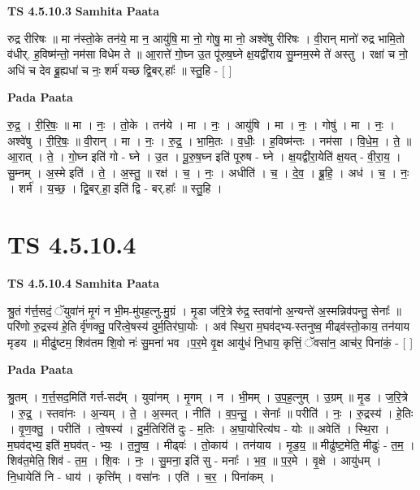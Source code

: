 \documentclass[17pt]{extarticle}
\begin{document}
\textbf{TS 4.5.10.3 } \newline
\textbf{Samhita Paata} \newline

रुद्र रीरिषः ॥ मा न॑स्तो॒के तन॑ये॒ मा न॒ आयु॑षि॒ मा नो॒ गोषु॒ मा नो॒ अश्वे॑षु रीरिषः । वी॒रान् मानो॑ रुद्र भामि॒तो व॑धीर्. ह॒विष्म॑न्तो॒ नम॑सा विधेम ते ॥ आ॒रात्ते॑ गो॒घ्न उ॒त पू॑रुष॒घ्ने क्ष॒यद्वी॑राय सु॒म्नम॒स्मे ते॑ अस्तु । रक्षा॑ च नो॒ अधि॑ च देव ब्रू॒ह्यधा॑ च नः॒ शर्म॑ यच्छ द्वि॒बर्.हाः᳚ ॥ स्तु॒हि - [  ] \newline

\textbf{Pada Paata} \newline

रु॒द्र॒ । री॒रि॒षः॒ ॥ मा । नः॒ । तो॒के । तन॑ये । मा । नः॒ । आयु॑षि । मा । नः॒ । गोषु॑ । मा । नः॒ । अश्वे॑षु । री॒रि॒षः॒ ॥ वी॒रान् । मा । नः॒ । रु॒द्र॒ । भा॒मि॒तः । व॒धीः॒ । ह॒विष्म॑न्तः । नम॑सा । वि॒धे॒म॒ । ते॒ ॥ आ॒रात् । ते॒ । गो॒घ्न इति॑ गो - घ्ने । उ॒त । पू॒रु॒ष॒घ्न इति॑ पूरुष - घ्ने । क्ष॒यद्वी॑रा॒येति॑ क्ष॒यत् - वी॒रा॒य॒ । सु॒म्नम् । अ॒स्मे इति॑ । ते॒ । अ॒स्तु॒ ॥ रक्ष॑ । च॒ । नः॒ । अधीति॑ । च॒ । दे॒व॒ । ब्रू॒हि॒ । अध॑ । च॒ । नः॒ । शर्म॑ । य॒च्छ॒ । द्वि॒बर्.हा॒ इति॑ द्वि - बर्.हाः᳚ ॥ स्तु॒हि ।  \newline




\section*{ TS 4.5.10.4 }

\textbf{TS 4.5.10.4 } \newline
\textbf{Samhita Paata} \newline

श्रु॒तं ग॑र्त्त॒सदं॒ ॅयुवा॑नं मृ॒गं न भी॒म-मु॑पह॒त्नु-मु॒ग्रं । मृ॒डा ज॑रि॒त्रे रु॑द्र॒ स्तवा॑नो अ॒न्यन्ते॑ अ॒स्मन्निव॑पन्तु॒ सेनाः᳚ ॥ परि॑णो रु॒द्रस्य॑ हे॒ति र्वृ॑णक्तु॒ परि॑त्वे॒षस्य॑ दुर्म॒तिर॑घा॒योः । अव॑ स्थि॒रा म॒घव॑द्भ्य-स्तनुष्व॒ मीढ्व॑स्तो॒काय॒ तन॑याय मृडय ॥ मीढु॑ष्टम॒ शिव॑तम शि॒वो नः॑ सु॒मना॑ भव ।प॒र॒मे वृ॒क्ष आयु॑धं नि॒धाय॒ कृत्तिं॒ ॅवसा॑न॒ आच॑र॒ पिना॑कं॒ - [  ] \newline

\textbf{Pada Paata} \newline

श्रु॒तम् । ग॒र्त्त॒सद॒मिति॑ गर्त्त-सद᳚म् । युवा॑नम् । मृ॒गम् । न । भी॒मम् । उ॒प॒ह॒त्नुम् । उ॒ग्रम् ॥ मृ॒ड । ज॒रि॒त्रे । रु॒द्र॒ । स्तवा॑नः । अ॒न्यम् । ते॒ । अ॒स्मत् । नीति॑ । व॒प॒न्तु॒ । सेनाः᳚ ॥ परीति॑ । नः॒ । रु॒द्रस्य॑ । हे॒तिः । वृ॒ण॒क्तु॒ । परीति॑ । त्वे॒षस्य॑ । दु॒र्म॒तिरिति॑ दुः - म॒तिः । अ॒घा॒योरित्य॑घ - योः ॥ अवेति॑ । स्थि॒रा । म॒घव॑द्भ्य॒ इति॑ म॒घव॑त् - भ्यः॒ । त॒नु॒ष्व॒ । मीढ्वः॑ । तो॒काय॑ । तन॑याय । मृ॒ड॒य॒ ॥ मीढु॑ष्ट॒मेति॒ मीढुः॑ - त॒म॒ । शिव॑त॒मेति॒ शिव॑ - त॒म॒ । शि॒वः । नः॒ । सु॒मना॒ इति॑ सु - मनाः᳚ । भ॒व॒ ॥ प॒र॒मे । वृ॒क्षे । आयु॑धम् । नि॒धायेति॑ नि - धाय॑ । कृत्ति᳚म् । वसा॑नः । एति॑ । च॒र॒ । पिना॑कम् ।  \newline
\end{document}
